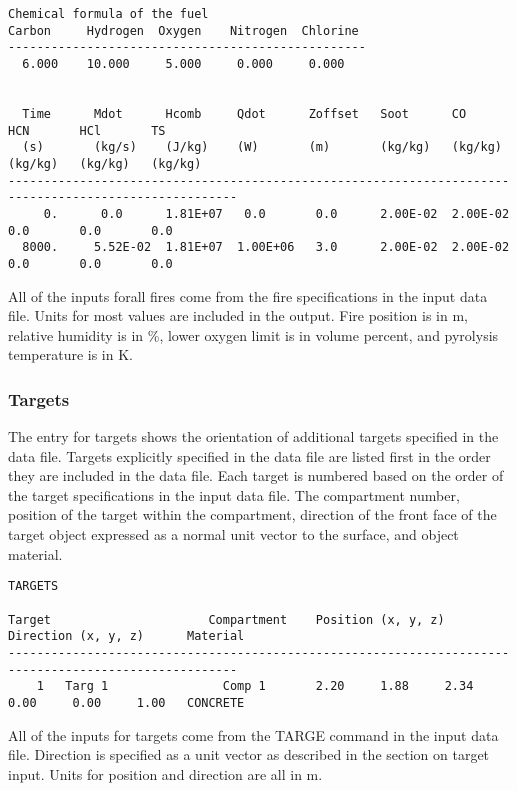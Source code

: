 \begin{lstlisting}[basicstyle=\tiny]
Chemical formula of the fuel
Carbon     Hydrogen  Oxygen    Nitrogen  Chlorine
--------------------------------------------------
  6.000    10.000     5.000     0.000     0.000


  Time      Mdot      Hcomb     Qdot      Zoffset   Soot      CO        HCN       HCl       TS
  (s)       (kg/s)    (J/kg)    (W)       (m)       (kg/kg)   (kg/kg)   (kg/kg)   (kg/kg)   (kg/kg)
------------------------------------------------------------------------------------------------------
     0.      0.0      1.81E+07   0.0       0.0      2.00E-02  2.00E-02   0.0       0.0       0.0
  8000.     5.52E-02  1.81E+07  1.00E+06   3.0      2.00E-02  2.00E-02   0.0       0.0       0.0
\end{lstlisting}
All of the inputs forall fires come from the fire specifications in the input data file.  Units for most values are included in the output.  Fire position is in m, relative humidity is in \%, lower oxygen limit is in volume percent, and pyrolysis temperature is in K.


\subsubsection{Targets}

The entry for targets shows the orientation of additional targets specified in the data file. Targets explicitly specified in the data file are listed first in the order they are included in the data file.  Each target is numbered based on the order of the target specifications in the input data file.  The compartment number, position of the target within the compartment, direction of the front face of the target object expressed as a normal unit vector to the surface, and object material.

\begin{lstlisting}[basicstyle=\tiny]
TARGETS

Target                      Compartment    Position (x, y, z)         Direction (x, y, z)      Material
------------------------------------------------------------------------------------------------------
    1   Targ 1                Comp 1       2.20     1.88     2.34     0.00     0.00     1.00   CONCRETE
\end{lstlisting}
All of the inputs for targets come from the TARGE command in the input data file. Direction is specified as a unit vector as described in the section on target input. Units for position and direction are all in m.


